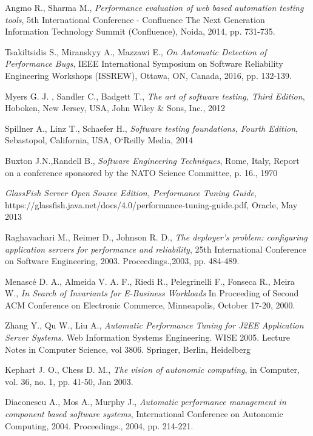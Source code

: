 \documentclass[12pt,a4paper]{article}
\begin{document}
\begin{thebibliography}{9}
Angmo R., Sharma M., 
\textit{Performance evaluation of web based automation testing tools}, 
5th International Conference - Confluence The Next Generation Information Technology Summit (Confluence), Noida, 2014, pp. 731-735.

Tsakiltsidis S., Miranskyy A., Mazzawi E., 
\textit{On Automatic Detection of Performance Bugs},
IEEE International Symposium on Software Reliability Engineering Workshops (ISSREW), Ottawa, ON, Canada, 2016, pp. 132-139.

Myers G. J. , Sandler C.,  Badgett T.,
\textit{The art of software testing, Third Edition},
Hoboken, New Jersey, USA, John Wiley \& Sons, Inc., 2012

Spillner A., Linz T., Schaefer H.,
\textit{Software testing foundations, Fourth Edition},
Sebastopol, California, USA, O‘Reilly Media, 2014

Buxton J.N.,Randell  B., 
\textit{Software Engineering Techniques}, 
Rome, Italy, Report on a conference sponsored by the NATO Science Committee, p. 16., 1970

\textit{GlassFish Server Open Source Edition, Performance Tuning Guide}, 
https://glassfish.java.net/docs/4.0/performance-tuning-guide.pdf,
Oracle, May 2013

Raghavachari M., Reimer D., Johnson R. D., 
\textit{The deployer's problem: configuring application servers for performance and reliability}, 
25th International Conference on Software Engineering, 2003. Proceedings.,2003, pp. 484-489.

Menascé D. A., Almeida V. A. F., Riedi R., Pelegrinelli F., Fonseca R., Meira W.,  
\textit{In Search of Invariants for E-Business Workloads} 
In Proceeding of Second ACM Conference on Electronic Commerce, Minneapolis, October 17-20, 2000. 

Zhang Y., Qu W., Liu A., 
\textit{Automatic Performance Tuning for J2EE Application Server Systems.}  Web Information Systems Engineering. WISE 2005. Lecture Notes in Computer Science, vol 3806. Springer, Berlin, Heidelberg

Kephart J. O., Chess D. M., 
\textit{The vision of autonomic computing}, in Computer, vol. 36, no. 1, pp. 41-50, Jan 2003.

Diaconescu A., Mos A., Murphy J., \textit{Automatic performance management in component based software systems}, International Conference on Autonomic Computing, 2004. Proceedings., 2004, pp. 214-221.


\end{thebibliography}
\end{document}
